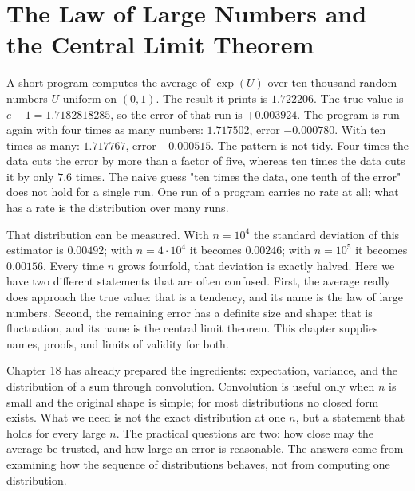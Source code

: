 \chapter{The Law of Large Numbers and the Central Limit Theorem}

A short program computes the average of $\exp(U)$ over ten thousand random numbers
$U$ uniform on $(0,1)$. The result it prints is $1.722206$. The true value is
$e-1=1.7182818285$, so the error of that run is $+0.003924$. The program is run
again with four times as many numbers: $1.717502$, error $-0.000780$. With ten
times as many: $1.717767$, error $-0.000515$. The pattern is not tidy. Four
times the data cuts the error by more than a factor of five, whereas ten times the
data cuts it by only $7.6$ times. The naive guess "ten times the data, one tenth
of the error" does not hold for a single run. One run of a program carries no rate
at all; what has a rate is the distribution over many runs.

That distribution can be measured. With $n=10^4$ the standard deviation of this
estimator is $0.00492$; with $n=4\cdot10^4$ it becomes $0.00246$; with $n=10^5$
it becomes $0.00156$. Every time $n$ grows fourfold, that deviation is exactly
halved. Here we have two different statements that are often confused. First, the
average really does approach the true value: that is a tendency, and its name is
the law of large numbers. Second, the remaining error has a definite size and
shape: that is fluctuation, and its name is the central limit theorem. This chapter
supplies names, proofs, and limits of validity for both.

Chapter 18 has already prepared the ingredients: expectation, variance, and the
distribution of a sum through convolution. Convolution is useful only when $n$ is
small and the original shape is simple; for most distributions no closed form
exists. What we need is not the exact distribution at one $n$, but a statement that
holds for every large $n$. The practical questions are two: how close may the
average be trusted, and how large an error is reasonable. The answers come from
examining how the sequence of distributions behaves, not from computing one
distribution.


